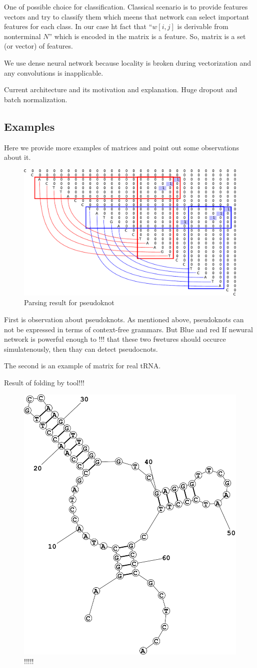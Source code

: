 \documentclass[a4paper,twoside]{article}
\begin{document}
\noindent One of possible choice for classification.
Classical scenario is to provide features vectors and try to classify them which meens that network can select important features for each class.
In our case ht fact that ``$w[i,j]$ is derivable from nonterminal $N$'' which is encoded in the matrix is a feature.
So, matrix is a set (or vector) of features.

We use dense neural network because locality is broken during vectorization and any convolutions is inapplicable.

Current architecture and its motivation and explanation.
Huge dropout and batch normalization.

\subsection{Examples}
\label{sec:examples}

\noindent Here we provide more examples of matrices and point out some observations about it.

\begin{figure}
\centering
\includegraphics[width=.5\textwidth]{figures/5.pdf}
\caption{Parsing result for pseudoknot}
\label{fig:pseudoknot}
\end{figure}

First is observation about pseudoknots. 
As mentioned above, pseudoknots can not be expressed in terms of context-free grammars. 
But 
Blue and red
If newural network is powerful enough to !!! that these two fwetures should occurce simulatenously, then thay can detect pseudocnots.

The second is an example of matrix for real tRNA.

Result of folding by tool!!!

\begin{figure}
\centering
\includegraphics[width=.5\textwidth]{figures/Fold1.pdf}
\caption{!!!!!}
\label{fig:!!!}
\end{figure}
\end{document}
